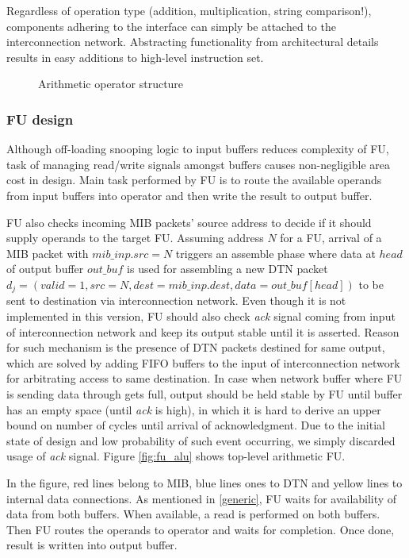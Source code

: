 	Regardless of operation type (addition, multiplication, string comparison!), components adhering to the interface can simply be attached to the interconnection network. Abstracting functionality from architectural details results in easy additions to high-level instruction set. 
	
	\begin{figure}[htbp]
		\centering
		\def\svgscale{0.5}
		
		\caption{Arithmetic operator structure}
		\label{fig:alu} 
	\end{figure}
	
	\subsubsection{FU design}
	
	Although off-loading snooping logic to input buffers reduces complexity of FU, task of managing read/write signals amongst buffers causes non-negligible area cost in design. Main task performed by FU is to route the available operands from input buffers into operator and then write the result to output buffer.
	
	FU also checks incoming MIB packets' source address to decide if it should supply operands to the target FU. Assuming address $N$ for a FU, arrival of a MIB packet with $mib\_inp.src = N$ triggers an assemble phase where data at $head$ of output buffer $out\_buf$ is used for assembling a new DTN packet $d_j = (valid=1, src=N, dest=mib\_inp.dest, data=out\_buf[head])$ to be sent to destination via interconnection network. Even though it is not implemented in this version, FU should also check \textit{ack} signal coming from input of interconnection network and keep its output stable until it is asserted. Reason for such mechanism is the presence of DTN packets destined for same output, which are solved by adding FIFO buffers to the input of interconnection network for arbitrating access to same destination. In case when network buffer where FU is sending data through gets full, output should be held stable by FU until buffer has an empty space (until \textit{ack} is high), in which it is hard to derive an upper bound on number of cycles until arrival of acknowledgment. Due to the initial state of design and low probability of such event occurring, we simply discarded usage of \textit{ack} signal. Figure \ref{fig:fu_alu} shows top-level arithmetic FU.
	
	In the figure, red lines  belong to MIB, blue lines ones to DTN and yellow lines to internal data connections.
	As mentioned in \ref{generic}, FU waits for availability of data from both buffers. When available, a read is performed on both buffers. Then FU routes the operands to operator and waits for completion. Once done, result is written into output buffer.
	
